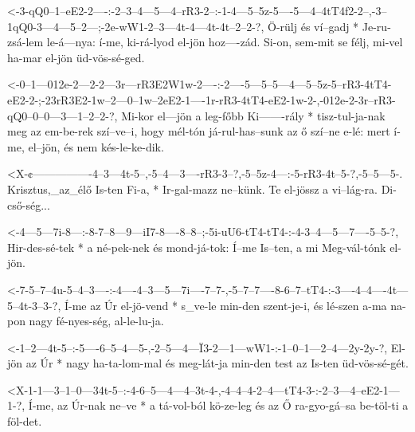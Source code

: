   {<-3-qQ0--1--eE2-2----:-2--3--4---5---4--rR3-2--:-1-4---5--5z-5----5---4--4tT4f2-2--,-3--1qQ0-3---4---5--2---;-2e-wW1-2--3---4t-4---4t-4t--2--2-?,}
  {  Ö-rülj és ví--gadj * Je-ru-zsá-lem le-á---nya: í-me, ki-rá-lyod el-jön hoz----zád. Si-on,  sem-mit se félj, mi-vel ha-mar el-jön üd-vös-sé-ged.}

  {<-0--1---012e-2---2-2---3r---rR3E2W1w-2----:-2----5---5--5---4---5--5z-5--rR3-4tT4-eE2-2-;-23rR3E2-1w--2---0--1w--2eE2-1----1r-rR3-4tT4-eE2-1w-2-,-012e-2-3r--rR3-qQ0--0--0---3---1--2--2-?,}
  {  Mi-kor el---jön a leg-főbb Ki-------rály * tisz-tul-ja-nak meg az em-be-rek szí--ve--i,  hogy    mél-tón já-rul-has--sunk az ő   szí--ne  e-lé:  mert í-me, el--jön, és nem kés-le-ke-dik.}


  {<X-¢----------------4--3---4t-5--,-5--4---3----rR3-3--?,-5--5z-4---:-5-rR3-4t--5-?,-5--5---5-.}
  {   Krisztus,_az_élő Is-ten Fi-a, * Ir-gal-mazz ne--künk. Te el-jössz a vi--lág-ra.  Di-cső-ség...}




  {<-4---5---7i-8---:-8-7--8---9---iI7-8----8--8--;-5i-uU6-tT4-tT4-:-4-3--4---5---7----5--5-?,}
  {  Hir-des-sé-tek * a né-pek-nek és  mond-já-tok: Í--me  Is--ten,  a mi Meg-vál-tónk el-jön.}

  {<-7-5--7--4u-5--4--3----:-4----4--3---5---7i----7--7-,-5--7--7----8-6--7--tT4-:-3----4--4----4t---5--4t-3--3-?,}
  {  Í-me az Úr el-jö-vend * s_ve-le min-den szent-je-i,  és lé-szen a-ma na-pon   nagy fé-nyes-ség, al-le-lu-ja.}

  {<-1--2---4t-5--:-5----6--5--4---5-,-2--5---4---Ï3-2---1---wW1-:-1--0--1---2--4---2y-2y-?,}
  {  El-jön az Úr * nagy ha-ta-lom-mal és meg-lát-ja min-den test  az Is-ten üd-vös-sé-gét.}

  {<X-1-1---3--1--0---34t-5--:-4-6--5---4---4--3t-4-,-4--4--4-2--4---tT4-3-:-2--3---4--eE2-1---1-?,}
  {   Í-me, az Úr-nak ne--ve * a tá-vol-ból kö-ze-leg és az Ő ra-gyo-gá--sa  be-töl-ti a   föl-det.}

